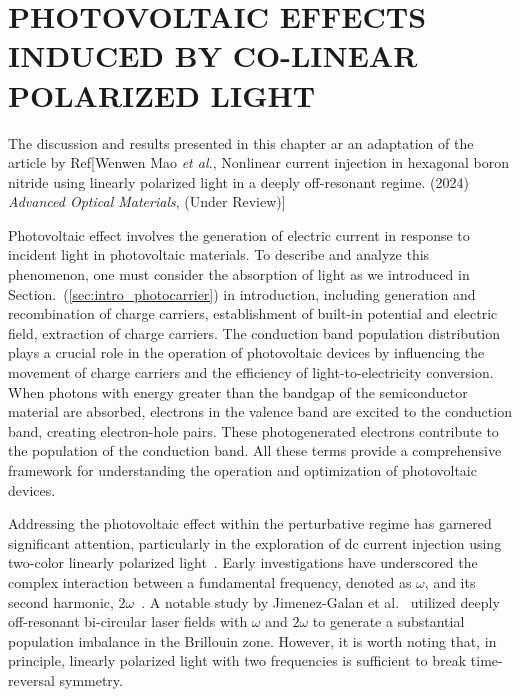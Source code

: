 \chapter{PHOTOVOLTAIC EFFECTS INDUCED BY CO-LINEAR POLARIZED LIGHT \label{ch:ch3}} 
The discussion and results presented in this chapter ar an adaptation of the article by Ref[Wenwen Mao \emph{et al.},  Nonlinear current injection in hexagonal boron nitride using linearly polarized light in a deeply off-resonant regime. (2024) {\it Advanced Optical Materials}, (Under Review)]

\color{red}
Photovoltaic effect involves the generation of electric current in response to incident light in photovoltaic materials. To describe and analyze this phenomenon, one must consider the absorption of light as we introduced in Section.~(\ref{sec:intro_photocarrier}) in introduction, including generation and recombination of charge carriers, establishment of built-in potential and electric field, extraction of charge carriers. The conduction band population distribution plays a crucial role in the operation of photovoltaic devices by influencing the movement of charge carriers and the efficiency of light-to-electricity conversion. When photons with energy greater than the bandgap of the semiconductor material are absorbed, electrons in the valence band are excited to the conduction band, creating electron-hole pairs. These photogenerated electrons contribute to the population of the conduction band. All these terms provide a comprehensive framework for understanding the operation and optimization of photovoltaic devices.
\color{black}

Addressing the photovoltaic effect within the perturbative regime has garnered significant
attention, particularly in the exploration of dc current injection using two-color linearly
polarized light~\cite{PhysRevLett.74.3596,PhysRevLett.76.1703,PhysRevLett.78.306,Sun2010,PhysRevB.100.075202,HeideBoolakeeEcksteinHommelhoff+2021+3701+3707,PhysRevLett.123.067402}.
Early investigations have underscored the complex interaction between a fundamental frequency, denoted as $\omega$, and its second harmonic, $2\omega$~\cite{PhysRevLett.74.3596,PhysRevLett.76.1703,PhysRevLett.78.306}. 
A notable study by Jimenez-Galan et al.~\cite{Jimenez-Galan2020} utilized deeply off-resonant bi-circular laser fields with $\omega$ and $2\omega$ to generate a substantial population imbalance in the Brillouin zone. However, it is worth noting that, in principle, linearly polarized light with two frequencies is sufficient to break time-reversal symmetry.


